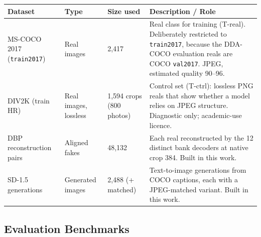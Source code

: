 \begin{longtable}{p{2.9cm} p{2.3cm} p{2.4cm} p{6.6cm}}
\toprule
\textbf{Dataset} & \textbf{Type} & \textbf{Size used} & \textbf{Description / Role} \\
\midrule
\endhead
MS-COCO 2017 (\texttt{train2017}) & Real images & 2{,}417 & Real class for training (T-real). Deliberately restricted to \texttt{train2017}, because the DDA-COCO evaluation reals are COCO \texttt{val2017}. JPEG, estimated quality 90--96. \\
\midrule
DIV2K (train HR) & Real images, lossless & 1{,}594 crops (800 photos) & Control set (T-ctrl): lossless PNG reals that show whether a model relies on JPEG structure. Diagnostic only; academic-use licence. \\
\midrule
DBP reconstruction pairs & Aligned fakes & 48{,}132 & Each real reconstructed by the 12 distinct bank decoders at native crop 384. Built in this work. \\
\midrule
SD-1.5 generations & Generated images & 2{,}488 (+ matched) & Text-to-image generations from COCO captions, each with a JPEG-matched variant. Built in this work. \\
\bottomrule
\end{longtable}

\subsection{Evaluation Benchmarks}

